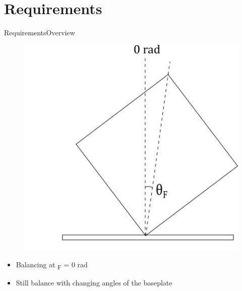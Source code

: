 
\section{Requirements}

\begin{frame}{Requirements}{Overview}
	
	\begin{figure}[H]
		\includegraphics[scale=0.4]{Pictures/reqCubli0rad.png}
		\centering
	\end{figure}
	
\begin{itemize}
 \item {Balancing at \si{\theta_F} =  0 rad}
 \linebreak
\item {Still balance with changing angles of the baseplate}
\end{itemize}


\end{frame}

